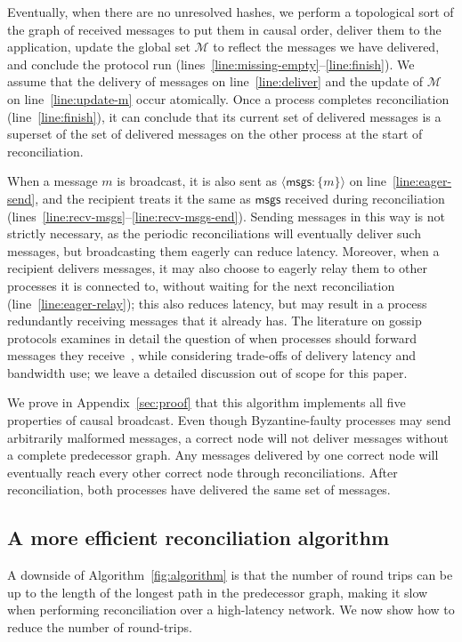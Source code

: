 \documentclass[a4paper,anonymous,USenglish]{lipics-v2019}
\begin{document}
Eventually, when there are no unresolved hashes, we perform a topological sort of the graph of received messages to put them in causal order, deliver them to the application, update the global set $\mathcal{M}$ to reflect the messages we have delivered, and conclude the protocol run (lines~\ref{line:missing-empty}--\ref{line:finish}).
We assume that the delivery of messages on line~\ref{line:deliver} and the update of $\mathcal{M}$ on line~\ref{line:update-m} occur atomically.
Once a process completes reconciliation (line~\ref{line:finish}), it can conclude that its current set of delivered messages is a superset of the set of delivered messages on the other process at the start of reconciliation.

When a message $m$ is broadcast, it is also sent as $\langle\mathsf{msgs}: \{m\}\rangle$ on line~\ref{line:eager-send}, and the recipient treats it the same as $\mathsf{msgs}$ received during reconciliation (lines~\ref{line:recv-msgs}--\ref{line:recv-msgs-end}).
Sending messages in this way is not strictly necessary, as the periodic reconciliations will eventually deliver such messages, but broadcasting them eagerly can reduce latency.
Moreover, when a recipient delivers messages, it may also choose to eagerly relay them to other processes it is connected to, without waiting for the next reconciliation (line~\ref{line:eager-relay}); this also reduces latency, but may result in a process redundantly receiving messages that it already has.
The literature on gossip protocols examines in detail the question of when processes should forward messages they receive~\cite{Leitao:2009fi}, while considering trade-offs of delivery latency and bandwidth use; we leave a detailed discussion out of scope for this paper.

We prove in Appendix~\ref{sec:proof} that this algorithm implements all five properties of causal broadcast.
Even though Byzantine-faulty processes may send arbitrarily malformed messages, a correct node will not deliver messages without a complete predecessor graph.
Any messages delivered by one correct node will eventually reach every other correct node through reconciliations.
After reconciliation, both processes have delivered the same set of messages.

\subsection{A more efficient reconciliation algorithm}\label{sec:algorithm2}

A downside of Algorithm~\ref{fig:algorithm} is that the number of round trips can be up to the length of the longest path in the predecessor graph, making it slow when performing reconciliation over a high-latency network.
We now show how to reduce the number of round-trips.
\end{document}
